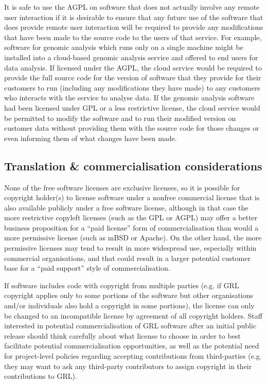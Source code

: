 \documentclass[10pt,a4paper]{article}
\begin{document}
\par It is safe to use the AGPL on software that does not actually involve any remote 
user interaction if it is desirable to ensure that any future use of the software that does provide 
remote user interaction will be required to provide any modifications that have been made 
to the source code to the users of that service. For example, software for genomic analysis 
which runs only on a single machine might be installed into a cloud-based genomic analysis 
service and offered to end users for data analysis. If licensed under the AGPL, the 
cloud service would be required to provide the full source code for the version of software 
that they provide for their customers to run (including any modifications they have made) 
to any customers who interacts with the service to analyse data. If the genomic analysis 
software had been licensed under GPL or a less restrictive license, the cloud service would 
be permitted to modify the software and to run their modified version on customer data 
without providing them with the source code for those changes or even informing them of 
what changes have been made. 




\subsection{Translation \& commercialisation considerations}

\par None of the free software licenses are exclusive licenses, so it 
is possible for copyright holder(s) to license software under 
a nonfree commercial license that is also available publicly under a free 
software license, although in that case the more restrictive copyleft 
licenses (such as the GPL or AGPL) may offer a better business
proposition for a ``paid license'' form of commercialisation than would 
a more permissive license (such as mBSD or Apache). On the other hand, 
the more permissive licenses may tend to result in more widespread use, 
especially within commercial organisations, and that could result in a 
larger potential customer base for a ``paid support'' style of commercialisation. 

\par If software includes code with copyright from multiple parties 
(e.g. if GRL copyright applies only to some portions of the software but other 
organisations and/or individuals also hold a copyright in some portions), the 
license can only be changed to an incompatible license by agreement of all 
copyright holders. Staff interested in potential commercialisation of GRL 
software after an initial public release should think carefully about what 
license to choose in order to best facilitate potential commercialisation 
opportunities, as well as the potential need for project-level policies 
regarding accepting contributions from third-parties (e.g. they may want to 
ask any third-party contributors to assign copyright in their contributions to 
GRL). 
\end{document}
